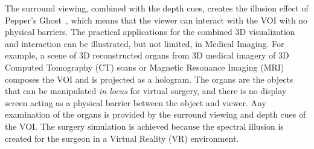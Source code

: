 The surround viewing, combined with the depth cues, creates the illusion effect of Pepper's Ghost~\cite{smithwick2014}, which means that the viewer can interact with the VOI with no physical barriers. The practical applications for the combined 3D visualization and interaction can be illustrated, but not limited, in Medical Imaging. For example, a scene of 3D reconstructed organs from 3D medical imagery of 3D Computed Tomography (CT) scans or Magnetic Resonance Imaging (MRI) composes the VOI and is projected as a hologram. The organs are the objects that can be manipulated \emph{in locus} for virtual surgery, and there is no display screen acting as a physical barrier between the object and viewer. Any examination of the organs is provided by the surround viewing and depth cues of the VOI. The surgery simulation is achieved because the spectral illusion is created for the surgeon in a Virtual Reality (VR) environment.




%